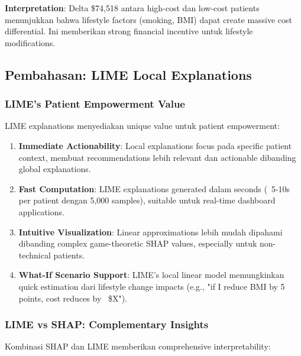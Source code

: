 \textbf{Interpretation}: Delta \$74,518 antara high-cost dan low-cost patients menunjukkan bahwa lifestyle factors (smoking, BMI) dapat create massive cost differential. Ini memberikan strong financial incentive untuk lifestyle modifications.

\subsection{Pembahasan: LIME Local Explanations}
\label{subsec:lime-discussion}

\subsubsection{LIME's Patient Empowerment Value}

LIME explanations menyediakan unique value untuk patient empowerment:

\begin{enumerate}
    \item \textbf{Immediate Actionability}: Local explanations focus pada specific patient context, membuat recommendations lebih relevant dan actionable dibanding global explanations.

    \item \textbf{Fast Computation}: LIME explanations generated dalam seconds (~5-10s per patient dengan 5,000 samples), suitable untuk real-time dashboard applications.

    \item \textbf{Intuitive Visualization}: Linear approximations lebih mudah dipahami dibanding complex game-theoretic SHAP values, especially untuk non-technical patients.

    \item \textbf{What-If Scenario Support}: LIME's local linear model memungkinkan quick estimation dari lifestyle change impacts (e.g., "if I reduce BMI by 5 points, cost reduces by ~\$X").
\end{enumerate}

\subsubsection{LIME vs SHAP: Complementary Insights}

Kombinasi SHAP dan LIME memberikan comprehensive interpretability:

